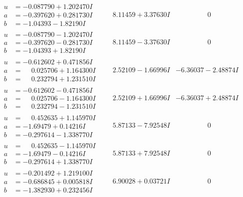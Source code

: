 \documentclass[1p]{elsarticle_modified}
\theoremstyle{definition}
\begin{document}
$$\begin{array}{c|c|c}
\begin{aligned}
u &= -0.087790 + 1.202470 I \\
a &= -0.397620 + 0.281730 I \\
b &= -1.04393 - 1.82190 I\end{aligned}
 & \phantom{-}8.11459 + 3.37630 I & \phantom{-0.000000 } 0 \\ \hline\begin{aligned}
u &= -0.087790 - 1.202470 I \\
a &= -0.397620 - 0.281730 I \\
b &= -1.04393 + 1.82190 I\end{aligned}
 & \phantom{-}8.11459 - 3.37630 I & \phantom{-0.000000 } 0 \\ \hline\begin{aligned}
u &= -0.612602 + 0.471856 I \\
a &= \phantom{-}0.025706 + 1.164300 I \\
b &= \phantom{-}0.232794 + 1.231510 I\end{aligned}
 & \phantom{-}2.52109 - 1.66996 I & -6.36037 - 2.48874 I \\ \hline\begin{aligned}
u &= -0.612602 - 0.471856 I \\
a &= \phantom{-}0.025706 - 1.164300 I \\
b &= \phantom{-}0.232794 - 1.231510 I\end{aligned}
 & \phantom{-}2.52109 + 1.66996 I & -6.36037 + 2.48874 I \\ \hline\begin{aligned}
u &= \phantom{-}0.452635 + 1.145970 I \\
a &= -1.69479 + 0.14216 I \\
b &= -0.297614 - 1.338770 I\end{aligned}
 & \phantom{-}5.87133 - 7.92548 I & \phantom{-0.000000 } 0 \\ \hline\begin{aligned}
u &= \phantom{-}0.452635 - 1.145970 I \\
a &= -1.69479 - 0.14216 I \\
b &= -0.297614 + 1.338770 I\end{aligned}
 & \phantom{-}5.87133 + 7.92548 I & \phantom{-0.000000 } 0 \\ \hline\begin{aligned}
u &= -0.201492 + 1.219100 I \\
a &= -0.686845 + 0.005818 I \\
b &= -1.382930 + 0.232456 I\end{aligned}
 & \phantom{-}6.90028 + 0.03721 I & \phantom{-0.000000 } 0 \\ \hline\begin{aligned}

\end{aligned}
\end{array}$$
\end{document}
